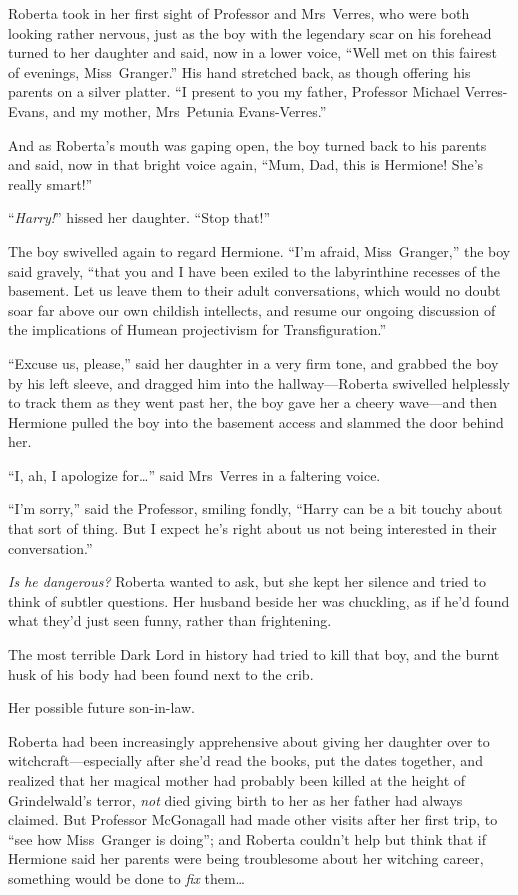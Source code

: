 Roberta took in her first sight of Professor and Mrs~Verres, who were both looking rather nervous, just as the boy with the legendary scar on his forehead turned to her daughter and said, now in a lower voice,
“Well met on this fairest of evenings, Miss~Granger.” His hand stretched back, as though offering his parents on a silver platter.
“I present to you my father, Professor Michael Verres-Evans, and my mother, Mrs~Petunia Evans-Verres.”

And as Roberta’s mouth was gaping open, the boy turned back to his parents and said, now in that bright voice again,
“Mum, Dad, this is Hermione! She’s really smart!”

“\emph{Harry!}” hissed her daughter.
“Stop that!”

The boy swivelled again to regard Hermione.
“I’m afraid, Miss~Granger,” the boy said gravely, “that you and I have been exiled to the labyrinthine recesses of the basement. Let us leave them to their adult conversations, which would no doubt soar far above our own childish intellects, and resume our ongoing discussion of the implications of Humean projectivism for Transfiguration.”

“Excuse us, please,” said her daughter in a very firm tone, and grabbed the boy by his left sleeve, and dragged him into the hallway—Roberta swivelled helplessly to track them as they went past her, the boy gave her a cheery wave—and then Hermione pulled the boy into the basement access and slammed the door behind her.

“I, ah, I apologize for…” said Mrs~Verres in a faltering voice.

“I’m sorry,” said the Professor, smiling fondly,
“Harry can be a bit touchy about that sort of thing. But I expect he’s right about us not being interested in their conversation.”

\emph{Is he dangerous?} Roberta wanted to ask, but she kept her silence and tried to think of subtler questions. Her husband beside her was chuckling, as if he’d found what they’d just seen funny, rather than frightening.

The most terrible Dark Lord in history had tried to kill that boy, and the burnt husk of his body had been found next to the crib.

Her possible future son-in-law.

Roberta had been increasingly apprehensive about giving her daughter over to witchcraft—especially after she’d read the books, put the dates together, and realized that her magical mother had probably been killed at the height of Grindelwald’s terror, \emph{not} died giving birth to her as her father had always claimed. But Professor McGonagall had made other visits after her first trip, to “see how Miss~Granger is doing”; and Roberta couldn’t help but think that if Hermione said her parents were being troublesome about her witching career, something would be done to \emph{fix} them…

